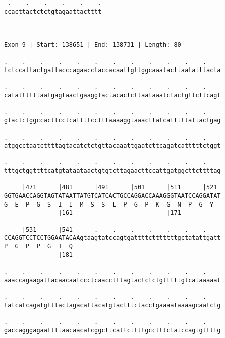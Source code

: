 \documentclass{article}
\begin{document}
\begin{Verbatim}
 .    .    .    .    .    .
ccacttactctctgtagaattactttt
                           
                           
 
Exon 9 | Start: 138651 | End: 138731 | Length: 80
 
.    .    .    .    .    .    .    .    .    .    .    .    
tctccattactgattacccagaacctaccacaattgttggcaaatacttaatatttacta
                                                            
.    .    .    .    .    .    .    .    .    .    .    .    
catattttttaatgagtaactgaaggtactacactcttaataaatctactgttcttcagt
                                                            
.    .    .    .    .    .    .    .    .    .    .    .    
gtactctggccacttcctcattttcctttaaaaggtaaacttatcatttttattactgag
                                                            
.    .    .    .    .    .    .    .    .    .    .    .    
atggcctaatcttttagtacatctctgttacaaattgaatcttcagatcatttttctggt
                                                            
.    .    .    .    .    .    .    .    .    .    .    .    
tttgctggttttcatgtataataactgtgtcttagaacttccattgatggcttcttttag
                                                            
     |471      |481      |491      |501      |511      |521 
GGTGAACCAGGTAGTATAATTATGTCATCACTGCCAGGACCAAAGGGTAATCCAGGATAT
G  E  P  G  S  I  I  M  S  S  L  P  G  P  K  G  N  P  G  Y  
               |161                          |171           
  
     |531      |541      .    .    .    .    .    .    .    
CCAGGTCCTCCTGGAATACAAgtaagtatccagtgattttctttttttgctatattgatt
P  G  P  P  G  I  Q                                         
               |181                                         
  
.    .    .    .    .    .    .    .    .    .    .    .    
aaaccagaagattacaacaatccctcaacctttagtactctctgtttttgtcataaaaat
                                                            
.    .    .    .    .    .    .    .    .    .    .    .    
tatcatcagatgtttactagacattacatgtactttctacctgaaaataaaagcaatctg
                                                            
.    .    .    .    .    .    .    .    .    .    .    .    
gaccagggagaattttaacaacatcggcttcattcttttgcctttctatccagtgttttg
                                                            

\end{Verbatim}
\end{document}
